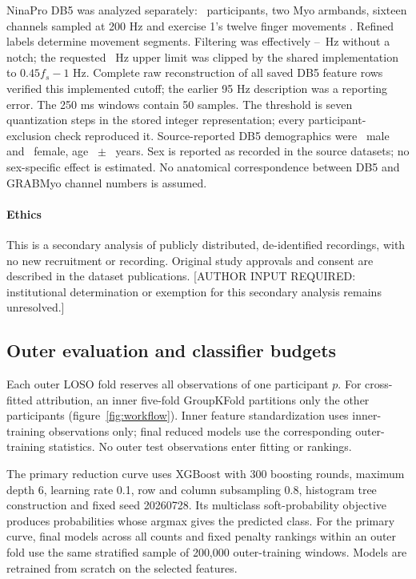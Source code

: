NinaPro DB5 was analyzed separately: \DBFiveSubjects\ participants, two Myo armbands, sixteen channels sampled at 200 Hz and exercise 1's twelve finger movements \citep{pizzolato2017comparison}. Refined labels determine movement segments. Filtering was effectively \RevDBFiveBandLow--\RevDBFiveBandHigh\ Hz without a notch; the requested \RevDBFiveBandRequestedHigh\ Hz upper limit was clipped by the shared implementation to $0.45f_s-1$ Hz. Complete raw reconstruction of all saved DB5 feature rows verified this implemented cutoff; the earlier 95 Hz description was a reporting error. The 250 ms windows contain 50 samples. The threshold is seven quantization steps in the stored integer representation; every participant-exclusion check reproduced it. Source-reported DB5 demographics were \DBFiveMale\ male and \DBFiveFemale\ female, age \DBFiveAgeMean\ $\pm$ \DBFiveAgeSD\ years. Sex is reported as recorded in the source datasets; no sex-specific effect is estimated. No anatomical correspondence between DB5 and GRABMyo channel numbers is assumed.

\paragraph{Ethics} This is a secondary analysis of publicly distributed, de-identified recordings, with no new recruitment or recording. Original study approvals and consent are described in the dataset publications. [AUTHOR INPUT REQUIRED: institutional determination or exemption for this secondary analysis remains unresolved.]

\subsection{Outer evaluation and classifier budgets}
Each outer LOSO fold reserves all observations of one participant $p$. For cross-fitted attribution, an inner five-fold GroupKFold partitions only the other participants (figure~\ref{fig:workflow}). Inner feature standardization uses inner-training observations only; final reduced models use the corresponding outer-training statistics. No outer test observations enter fitting or rankings.

The primary reduction curve uses XGBoost with 300 boosting rounds, maximum depth 6, learning rate 0.1, row and column subsampling 0.8, histogram tree construction and fixed seed 20260728. Its multiclass soft-probability objective produces probabilities whose argmax gives the predicted class. For the primary curve, final models across all counts and fixed penalty rankings within an outer fold use the same stratified sample of 200,000 outer-training windows. Models are retrained from scratch on the selected features.

